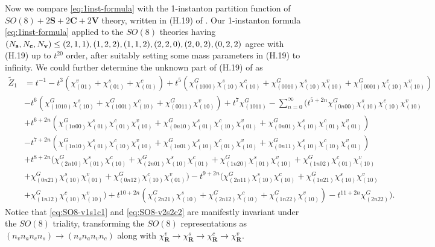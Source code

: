 \documentclass[letterpaper, 11pt]{article}
\newcommand{\nn}{\nonumber}
\begin{document}
{Now we compare \eqref{eq:1inst-formula} with the 1-instanton partition function of $SO(8) + 2\mathbf{S}
 + 2\mathbf{C} + 2\mathbf{V}$ theory, written in (H.19) of \cite{DelZotto:2018tcj}. Our 1-instanton formula \eqref{eq:1inst-formula} applied to the $SO(8)$ theories having $( N_{\bf s},  N_{\bf c}, N_{\bf v}) \leq (2,1,1), (1,2,2), (1,1,2),(2,2,0),(2,0,2),(0,2,2)$ agree with (H.19) up to $t^{20}$ order, after suitably setting some mass parameters in (H.19) to infinity. We could further determine the unknown part of (H.19) of \cite{DelZotto:2018tcj} as 
 \begin{align}
  \label{eq:SO8-v2s2c2}
  \tilde{Z}_1 &= t^{-1} - t^3(\chi_{(01)}^v+\chi_{(01)}^s+\chi_{(01)}^c) 
  +t^5(\chi^G_{(1000)}\chi^s_{(10)}\chi^c_{(10)}+\chi^G_{(0010)}\chi^s_{(10)}\chi^v_{(10)}+\chi^G_{(0001)}\chi^c_{(10)}\chi^v_{(10)}) \nn \\&
  -t^6(\chi^G_{(1010)}\chi_{(10)}^s+\chi^G_{(1001)}\chi_{(10)}^c+\chi^G_{(0011)}\chi_{(10)}^v) + t^7 \chi_{(1011)}^G - \sum_{n=0}^\infty \Big(t^{5+2n}\chi_{(0n00)}^G \chi^s_{(10)}\chi^c_{(10)} \chi^v_{(10)}  \nn \\&
  + t^{6+2n}(\chi^G_{(1n00)}\chi^s_{(01)}\chi^c_{(01)}\chi^v_{(10)}+\chi^G_{(0n10)}\chi^s_{(01)}\chi^c_{(10)}\chi^v_{(01)}+\chi^G_{(0n01)}\chi^s_{(10)}\chi^c_{(01)}\chi^v_{(01)}) \nn \\&- t^{7+2n} 
  (\chi^G_{(1n10)}\chi^s_{(01)}\chi^c_{(10)}\chi^v_{(10)}+\chi^G_{(1n01)}\chi^s_{(10)}\chi^c_{(01)}\chi^v_{(10)}+\chi^G_{(0n11)}\chi^s_{(10)}\chi^c_{(10)}\chi^v_{(01)})  \\& +  t^{8+2n}
  (\chi^G_{(2n10)}\chi^s_{(01)}\chi^c_{(10)}+\chi^G_{(2n01)}\chi^s_{(10)}\chi^c_{(01)}+\chi^G_{(1n20)}\chi^s_{(01)}\chi^v_{(10)}+\chi^G_{(1n02)}\chi^c_{(01)}\chi^v_{(10)} \nn\\&
  +\chi^G_{(0n21)}\chi^s_{(10)}\chi^v_{(01)}+\chi^G_{(0n12)}\chi^c_{(10)}\chi^v_{(01)}) - t^{9+2n}(\chi^G_{(2n11)}\chi^s_{(10)}\chi^c_{(10)}+\chi^G_{(1n21)}\chi^s_{(10)}\chi^v_{(10)} \nn\\&
  +\chi^G_{(1n12)}\chi^c_{(10)}\chi^v_{(10)}) +  t^{10+2n} (\chi^G_{(2n21)}\chi^s_{(10)}+\chi^G_{(2n12)}\chi^c_{(10)} + \chi^G_{(1n22)}\chi^v_{(10)}) -  t^{11+2n} \chi^G_{(2n22)}\Big). \nn
\end{align}
Notice that \eqref{eq:SO8-v1s1c1} and \eqref{eq:SO8-v2s2c2} are manifestly invariant under the $SO(8)$ triality, transforming the $SO(8)$ representations as $(n_vn_an_cn_s) \rightarrow (n_sn_an_vn_c)$ 
along with $\chi^v_\mathbf{R} \rightarrow \chi^s_\mathbf{R} \rightarrow \chi^c_\mathbf{R} \rightarrow \chi^v_\mathbf{R}$.
}
\end{document}
